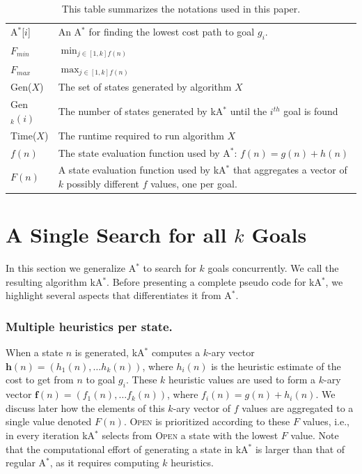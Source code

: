 \documentclass{aicom2e}
\newcommand{\astar}{A$^*$}
\newcommand{\kastar}{kA$^*$}
\newcommand{\astari}[1]{A$^*$[$#1$]}
\newcommand{\open}{\textsc{Open}}
\begin{document}
\begin{table}
\begin{tabular}{|l|l|}
        \hline
		\astari{i}  & An \astar{} for finding the lowest cost path to goal $g_i$. \\
		$F_{min}$   & $\min_{j\in[1,k] f(n)}$\\
        $F_{max}$   & $\max_{j\in[1,k] f(n)}$\\
        Gen($X$)    & The set of states generated by algorithm $X$ \\
        Gen$_k(i)$  & The number of states generated by \kastar{} until the $i^{th}$ goal is found\\
        Time($X$)   & The runtime required to run algorithm $X$ \\
        $f(n)$      & The state evaluation function used by \astar{}: $f(n)=g(n)+h(n)$ \\
        $F(n)$      & A state evaluation function used by \kastar{} that aggregates a vector of $k$ possibly different $f$ values, one per goal. \\
        \hline
    \end{tabular}
\caption{This table summarizes the notations used in this paper.}
\label{tab:notations} 
\end{table}


\section{A Single Search for all  $k$ Goals}
\label{sec:one-k-goal-search}

In this section we generalize \astar{} to search for $k$ goals concurrently. We
call the resulting algorithm \kastar{}. Before presenting a complete pseudo
code for \kastar{}, we highlight several aspects that differentiates it from \astar{}.

\subsubsection*{Multiple heuristics per state.}


When a state $n$ is generated, \kastar{} computes a $k$-ary vector 
$\textbf{h}(n)=(h_1(n),\ldots h_k(n))$, where $h_i(n)$ is the heuristic
estimate of the cost to get from $n$ to goal $g_i$. These $k$ heuristic values
are used to form a $k$-ary vector $\textbf{f}(n)=(f_1(n),\ldots f_k(n))$, where
$f_i(n)=g(n)+h_i(n)$. We discuss later how the elements of this $k$-ary vector of $f$ values are aggregated to a single value denoted $F(n)$.
\open{} is prioritized according to these $F$ values, i.e., in every iteration \kastar{} selects from \open{} a state with the lowest $F$ value. Note that the
computational effort of generating a state in \kastar{} is larger than that of
regular \astar{}, as it requires computing $k$ heuristics.
\end{document}
